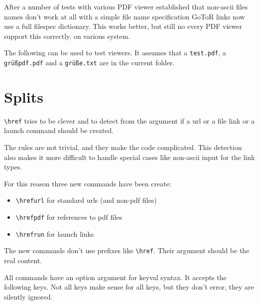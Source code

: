 \documentclass{article}
\newcommand\cs[1]{\texttt{\textbackslash #1}}
\begin{document}
After a number of tests with various PDF viewer established that non-ascii files names don't
work at all with a simple file name specification GoToR links now use a full
filespec dictionary. This works better, but still no every PDF viewer support this correctly.
on various system.

The following can be used to test viewers. It assumes that a \texttt{test.pdf},
a \texttt{grüßpdf.pdf} and a \texttt{grüße.txt} are in the current folder.





\section{Splits}

\cs{href} tries to be clever and to detect from the argument
if a url or a file link or a launch command should be created.

The rules are not trivial, and they make the code complicated.
This detection also makes it more difficult to handle special cases
like non-ascii input for the link types.

For this reason three new commands have been create:

\begin{itemize}
\item \cs{hrefurl} for standard urls (and non-pdf files)
\item \cs{hrefpdf} for references to pdf files
\item \cs{hrefrun} for launch links
\end{itemize}

The new commands don't use prefixes like \cs{href}.
Their argument should be the real content.

All commands have an option argument for keyval syntax.
It accepts the following keys. Not all keys make sense for all keys, but they don't
error, they are silently ignored.
\end{document}
